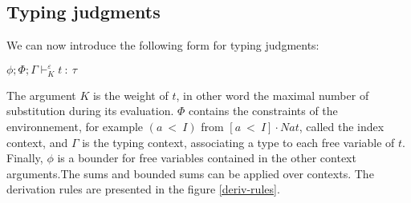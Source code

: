 \documentclass[a4paper,12pt]{article}
\begin{document}
\subsection{Typing judgments}

We can now introduce the following form for typing judgments:

\begin{center}
  $\phi; \Phi; \Gamma \vdash_{K}^{\varepsilon} t~:~\tau$
\end{center}

The argument $K$ is the weight of $t$, in other word the maximal
number of substitution during its evaluation. $\Phi$ contains the
constraints of the environnement, for example $(a~<~I)$ from 
$[a~<~I] \cdot Nat$, called the index context, and $\Gamma$ is the typing
context, associating a type to each free variable of $t$.  Finally,
$\phi$ is a bounder for free variables contained in the other context
arguments.The sums and bounded sums can be applied over contexts. The
derivation rules are presented in the figure \ref{deriv-rules}.
\end{document}

